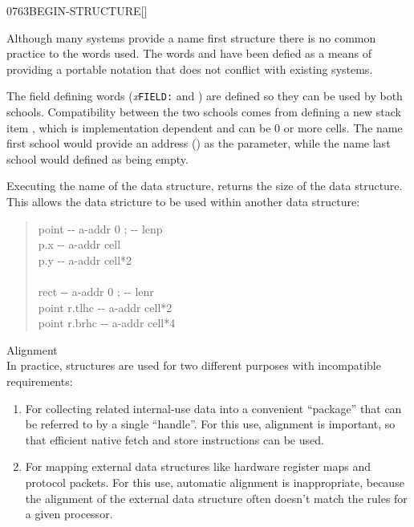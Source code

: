 \begin{worddef}{0763}{BEGIN-STRUCTURE}[]
\begin{rationale}
		Although many systems provide a name first structure there
		is no common practice to the words used.  The words
		 and  have been
		defied as a means of providing a portable notation that does
		not conflict with existing systems.

		The field defining words (\emph{x}\texttt{FIELD:} and
		) are defined so they can be used by both
		schools.  Compatibility between the two schools comes from
		defining a new stack item , which is
		implementation dependent and can be 0 or more cells.
		The name first school would provide an address ()
		as the  parameter, while the name last
		school would defined  as being empty.

		Executing the name of the data structure, returns the size of
		the data structure.  This allows the data stricture to be used
		within another data structure:

		\begin{quote}\ttfamily
		 point \tab[-0.1]  -{}- a-addr 0 ; -{}- lenp \\
		\tab {} p.x		\tab[5.5]  -{}- a-addr cell \\
		\tab {} p.y      \tab[5.5]  -{}- a-addr cell*2 \\
		 \\

		 rect  \tab[1.3] -{}- a-addr 0 ; -{}- lenr \\
		\tab point  r.tlhc   \tab {} -{}- a-addr cell*2 \\
		\tab point  r.brhc   \tab {} -{}- a-addr cell*4 \\
		\end{quote}

	\item[Alignment] ~\\
		In practice, structures are used for two different purposes
		with incompatible requirements:
		\begin{enumerate}
		\item For collecting related internal-use data into a
			convenient ``package'' that can be referred to by a
			single ``handle''. For this use, alignment is important,
			so that efficient native fetch and store instructions
			can be used.

		\item For mapping external data structures like hardware
			register maps and protocol packets. For this use,
			automatic alignment is inappropriate, because the
			alignment of the external data structure often doesn't
			match the rules for a given processor.
		\end{enumerate}


\end{rationale}
\end{worddef}
